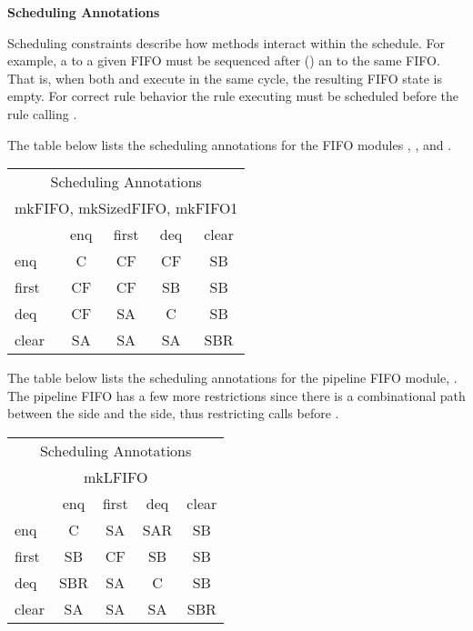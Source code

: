 {\bf Scheduling Annotations}

Scheduling constraints describe how methods interact within the schedule.
  For example, a  to a given
FIFO must be sequenced after () an  to the same
  FIFO.  That is, when both  and  execute in the same
  cycle, the resulting FIFO state is empty.  For correct rule behavior
  the rule executing  must be scheduled before the rule
  calling .  

The  table below lists the scheduling annotations for the FIFO modules
, , and .

\begin{center}
\begin{tabular}{|p{.75 in}|c|c|c|c|}
\hline
\multicolumn{5}{|c|}{Scheduling Annotations}\\
\multicolumn{5}{|c|}{mkFIFO, mkSizedFIFO, mkFIFO1}\\
\hline
&enq&first&deq&clear\\
\hline
\hline
enq&C &CF&CF&SB\\
\hline
first&CF&CF&SB&SB\\
\hline
deq&CF&SA&C&SB\\
\hline
clear&SA&SA&SA&SBR\\
\hline
\hline
\end{tabular}
\end{center}

The  table below lists the scheduling annotations for the pipeline
FIFO module, .  The pipeline FIFO has a few more
restrictions since there is a combinational path between the 
side and the  side, thus restricting  calls before .

\begin{center}
\begin{tabular}{|p{.75 in}|c|c|c|c|}
\hline
\multicolumn{5}{|c|}{Scheduling Annotations}\\
\multicolumn{5}{|c|}{mkLFIFO}\\
\hline
&enq&first&deq&clear\\
\hline
\hline
 enq&C &SA&SAR&SB\\
\hline
 first&SB&CF&SB&SB\\
\hline
 deq&SBR&SA&C&SB\\
\hline
 clear&SA&SA&SA&SBR\\
\hline
\hline
\end{tabular}
\end{center}

